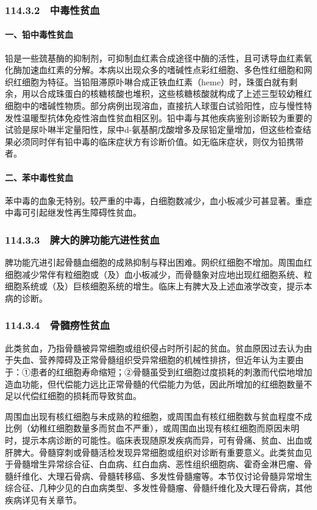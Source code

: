 \subsubsection{114.3.2　中毒性贫血}

\paragraph{一、铅中毒性贫血}

铅是一些巯基酶的抑制剂，可抑制血红素合成途径中酶的活性，且可诱导血红素氧化酶加速血红素的分解。本病以出现众多的嗜碱性点彩红细胞、多色性红细胞和网织红细胞为特征。当铅阻滞原卟啉合成正铁血红素（heme）时，珠蛋白就有剩余，用以合成珠蛋白的核糖核酸也堆积，这些核糖核酸就构成了上述三型较幼稚红细胞中的嗜碱性物质。部分病例出现溶血，直接抗人球蛋白试验阳性，应与慢性特发性温暖型抗体免疫性溶血性贫血相区别。铅中毒与其他疾病鉴别诊断较为重要的试验是尿卟啉半定量阳性，尿中d-氨基酮戊酸增多及尿铅定量增加，但这些检查结果必须同时伴有铅中毒的临床症状方有诊断价值。如无临床症状，则仅为铅携带者。

\paragraph{二、苯中毒性贫血}

苯中毒的血象无特别。较严重的中毒，白细胞数减少，血小板减少可甚显著。重症中毒可引起继发性再生障碍性贫血。

\subsubsection{114.3.3　脾大的脾功能亢进性贫血}

脾功能亢进引起骨髓血细胞的成熟抑制与释出困难。网织红细胞不增加。周围血红细胞减少常伴有粒细胞或（及）血小板减少，而骨髓象对应地出现红细胞系统、粒细胞系统或（及）巨核细胞系统的增生。临床上有脾大及上述血液学改变，提示本病的诊断。

\subsubsection{114.3.4　骨髓痨性贫血}

此类贫血，乃指骨髓被异常细胞或组织侵占时所引起的贫血。贫血原因过去认为由于失血、营养障碍及正常骨髓组织受异常细胞的机械性排挤，但近年认为主要由于：①患者的红细胞寿命缩短；②骨髓虽受到红细胞过度损耗的刺激而代偿地增加造血功能，但代偿能力远比正常骨髓的代偿能力为低，因此所增加的红细胞数量不足以代偿红细胞的损耗而导致贫血。

周围血出现有核红细胞与未成熟的粒细胞，或周围血有核红细胞数与贫血程度不成比例（幼稚红细胞数量多而贫血不严重），或周围血出现有核红细胞而原因未明时，提示本病诊断的可能性。临床表现随原发疾病而异，可有骨痛、贫血、出血或肝脾大。骨髓穿刺或骨髓活检发现异常细胞或组织对诊断有重要意义。此类贫血见于骨髓增生异常综合征、白血病、红白血病、恶性组织细胞病、霍奇金淋巴瘤、骨髓纤维化、大理石骨病、骨髓转移癌、多发性骨髓瘤等。本节仅讨论骨髓异常增生综合征、几种少见的白血病类型、多发性骨髓瘤、骨髓纤维化及大理石骨病，其他疾病详见有关章节。

